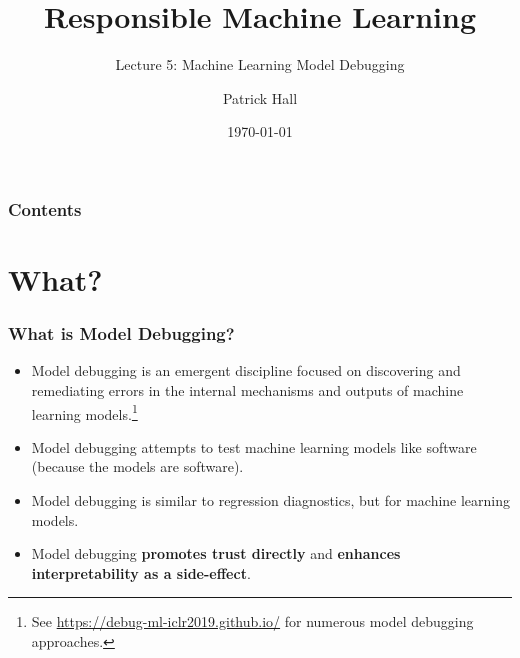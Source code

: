 \documentclass[11pt,
               aspectratio=169,
               hyperref={colorlinks}
               ]{beamer}
\author{Patrick Hall}
\title{Responsible Machine Learning}
\subtitle{Lecture 5: Machine Learning Model Debugging}
\institute{The George Washington University}
\date{\today}
\begin{document}
	
	\maketitle
	
	\begin{frame}
	
		\frametitle{Contents}
		
		\tableofcontents{}
		
	\end{frame}

	\section{What?}

	\begin{frame}
		
		\frametitle{What is Model Debugging?}
		
		\begin{itemize}
			\item Model debugging is an emergent discipline focused on discovering and remediating errors in the internal mechanisms and outputs of machine learning models.\footnote{\tiny{See \url{https://debug-ml-iclr2019.github.io/} for numerous model debugging approaches.}} 
			\item Model debugging attempts to test machine learning models like software (because the models are software).
			\item Model debugging is similar to regression diagnostics, but for machine learning models.
			\item Model debugging \textbf{promotes trust directly} and \textbf{enhances interpretability as a side-effect}.
		\end{itemize}
		
	\end{frame}
	

          
  
\end{document}
